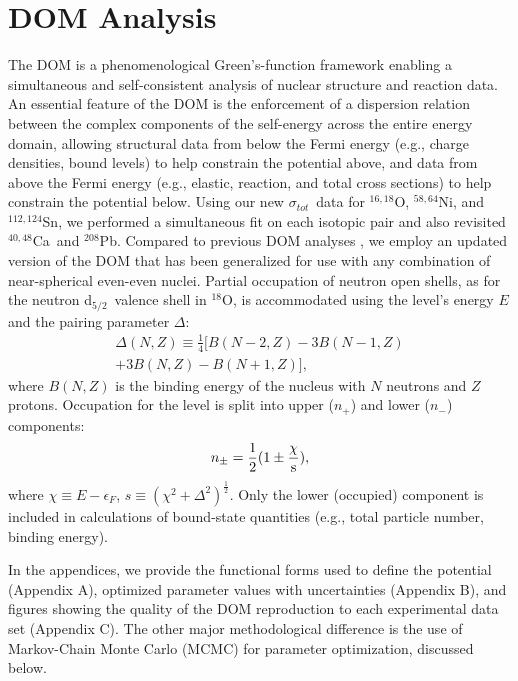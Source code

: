 \documentclass[twocolumn,secnumarabic,amssymb, nobibnotes, aps, prl,
superscriptaddress, nobalancelastpage, floatfix]{revtex4}
\newcommand{\tot}{\ensuremath{\sigma_{tot}}}
\newcommand{\oEight}{\ensuremath{^{18}}O}
\newcommand{\oSixEight}{\ensuremath{^{16,18}}O}
\newcommand{\caAughtEight}{\ensuremath{^{40,48}}C\lowercase{a}}
\newcommand{\niEightFour}{\ensuremath{^{58,64}}N\lowercase{i}}
\newcommand{\snTwelveFour}{\ensuremath{^{112,124}}S\lowercase{n}}
\newcommand{\pbEight}{\ensuremath{^{208}}P\lowercase{b}}
\newcommand{\dFive}{d\ensuremath{_{5/2}}}
\begin{document}
\section{DOM Analysis}
The DOM is a phenomenological Green's-function
framework enabling a simultaneous and self-consistent analysis of nuclear
structure and reaction data. An essential feature of the DOM is the enforcement of a dispersion
relation between the complex components of the self-energy across the entire
energy domain, allowing structural data from below the Fermi energy
(e.g., charge densities, bound levels) to help constrain the potential above,
and data from above the Fermi energy (e.g., elastic, reaction, and total
cross sections) to help constrain the potential
below. Using our new \tot\ data for \oSixEight, \niEightFour, and \snTwelveFour, we
performed a simultaneous fit on each isotopic pair and also
revisited \caAughtEight\ and \pbEight. Compared to previous DOM
analyses \cite{Mueller2011, Atkinson2018, Mahzoon2014, Mahzoon2017},
we employ an updated version of the DOM that has been generalized for use with
any combination of near-spherical even-even nuclei. Partial occupation of neutron open shells,
as for the neutron \dFive\ valence shell in \oEight, is accommodated using the level's energy $E$ and
the pairing parameter $\Delta$:
\begin{equation}
    \begin{split}
        \Delta(N,Z) \equiv \frac{1}{4}[B(N-2,Z)-3B(N-1,Z) \\
        +3B(N,Z)-B(N+1,Z)],
    \end{split}
\end{equation}
where $B(N,Z)$ is the binding energy of the nucleus with $N$ neutrons and $Z$ protons.
Occupation for the level is split into upper ($n_{+}$) and lower ($n_{-}$) components:
\begin{equation}
    n_{\pm} = \frac{1}{2}(1\pm\frac{\chi}{\s}),
\end{equation}
where $\chi \equiv E-\epsilon_{F}$, $s \equiv (\chi^{2}+\Delta^{2})^{\frac{1}{2}}$.
Only the lower (occupied) component is included in calculations of bound-state quantities
(e.g., total particle number, binding energy).

In the appendices, we provide the functional forms
used to define the potential (Appendix A), optimized parameter values with
uncertainties (Appendix B), and figures showing the quality
of the DOM reproduction to each experimental data set (Appendix C).
The other major methodological difference is the use of Markov-Chain Monte Carlo
(MCMC) for parameter optimization, discussed below. 
\end{document}
